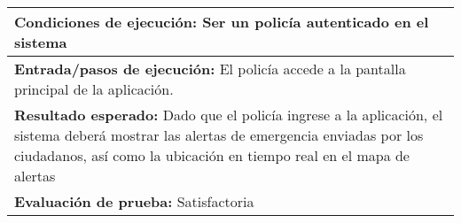 \begin{longtable}{|p{6.7cm}|p{6.7cm}|}
    \hline
    \multicolumn{2}{|p{13.4cm}|}{\textbf{Condiciones de ejecución:} Ser un policía autenticado en el sistema}                                                                                                                                            \\
    \hline
    \multicolumn{2}{|p{13.4cm}|}{\textbf{Entrada/pasos de ejecución:} El policía accede a la pantalla principal de la aplicación.}                                                                                                                       \\
    \hline
    \multicolumn{2}{|p{13.4cm}|}{\textbf{Resultado esperado:} Dado que el policía ingrese a la aplicación, el sistema deberá mostrar las alertas de emergencia enviadas por los ciudadanos,  así como la ubicación en tiempo real en el mapa de alertas} \\
    \hline
    \multicolumn{2}{|p{13.4cm}|}{\textbf{Evaluación de prueba:} Satisfactoria}                                                                                                                                                                           \\
    \hline
\end{longtable}


